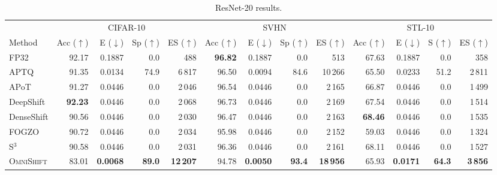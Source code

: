 \documentclass[12pt]{article}
\newcommand{\omnishift}{\textsc{OmniShift}}
\begin{document}
\begin{table}[H]
\centering
\scriptsize
\caption{ResNet-20 results.}
\label{tab:r20}
\setlength{\tabcolsep}{3pt}
\begin{tabular}{@{}l rrrr rrrr rrrr@{}}
\toprule
& \multicolumn{4}{c}{CIFAR-10} & \multicolumn{4}{c}{SVHN} & \multicolumn{4}{c}{STL-10} \\
\cmidrule(lr){2-5}\cmidrule(lr){6-9}\cmidrule(lr){10-13}
Method & Acc ($\uparrow$) & E ($\downarrow$) & Sp ($\uparrow$) & ES ($\uparrow$) & Acc ($\uparrow$) & E ($\downarrow$) & Sp ($\uparrow$) & ES ($\uparrow$) & Acc ($\uparrow$) & E ($\downarrow$) & S ($\uparrow$) & ES ($\uparrow$) \\
\midrule
FP32         & 92.17 & 0.1887 &  0.0 &   488 & \textbf{96.82} & 0.1887 & 0.0 & 513 & 67.63 & 0.1887 & 0.0 & 358 \\
APTQ         & 91.35 & 0.0134 & 74.9 &  6\,817 & 96.50 & 0.0094 & 84.6 & 10\,266 & 65.50 & 0.0233 & 51.2 & 2\,811 \\
APoT         & 91.27 & 0.0446 &  0.0 &  2\,046 & 96.54 & 0.0446 &  0.0 &  2\,165 & 66.87 & 0.0446 &  0.0 & 1\,499 \\
DeepShift    & \textbf{92.23} & 0.0446 & 0.0 & 2\,068 & 96.73 & 0.0446 & 0.0 & 2\,169 & 67.54 & 0.0446 & 0.0 & 1\,514 \\
DenseShift   & 90.56 & 0.0446 &  0.0 &  2\,030 & 96.47 & 0.0446 &  0.0 &  2\,163 & \textbf{68.46} & 0.0446 & 0.0 & 1\,535 \\
FOGZO        & 90.72 & 0.0446 &  0.0 &  2\,034 & 95.98 & 0.0446 &  0.0 &  2\,152 & 59.03 & 0.0446 &  0.0 & 1\,324 \\
S$^3$        & 90.58 & 0.0446 &  0.0 &  2\,031 & 96.36 & 0.0446 &  0.0 &  2\,161 & 68.11 & 0.0446 &  0.0 & 1\,527 \\
\midrule
\omnishift{} & 83.01 & \textbf{0.0068} & \textbf{89.0} & \textbf{12\,207} & 94.78 & \textbf{0.0050} & \textbf{93.4} & \textbf{18\,956} & 65.93 & \textbf{0.0171} & \textbf{64.3} & \textbf{3\,856} \\
\bottomrule
\end{tabular}
\end{table}
\end{document}
